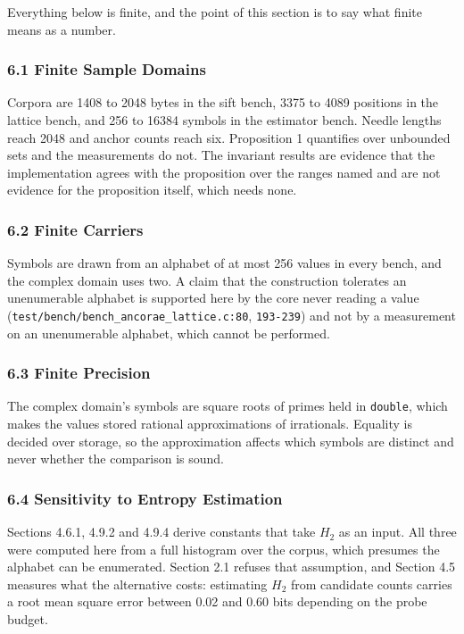 Everything below is finite, and the point of this section is to say what finite means as a number.

\subsubsection{6.1 Finite Sample Domains}

Corpora are 1408 to 2048 bytes in the sift bench, 3375 to 4089 positions in the lattice bench, and 256 to 16384 symbols in the estimator bench. Needle lengths reach 2048 and anchor counts reach six. Proposition 1 quantifies over unbounded sets and the measurements do not. The invariant results are evidence that the implementation agrees with the proposition over the ranges named and are not evidence for the proposition itself, which needs none.

\subsubsection{6.2 Finite Carriers}

Symbols are drawn from an alphabet of at most 256 values in every bench, and the complex domain uses two. A claim that the construction tolerates an unenumerable alphabet is supported here by the core never reading a value (\texttt{test/\allowbreak{}bench/\allowbreak{}bench\_\allowbreak{}ancorae\_\allowbreak{}lattice.\allowbreak{}c:80}, \texttt{193-\allowbreak{}239}) and not by a measurement on an unenumerable alphabet, which cannot be performed.

\subsubsection{6.3 Finite Precision}

The complex domain's symbols are square roots of primes held in \texttt{double}, which makes the values stored rational approximations of irrationals. Equality is decided over storage, so the approximation affects which symbols are distinct and never whether the comparison is sound.

\subsubsection{6.4 Sensitivity to Entropy Estimation}

Sections 4.6.1, 4.9.2 and 4.9.4 derive constants that take \(H_2\) as an input. All three were computed here from a full histogram over the corpus, which presumes the alphabet can be enumerated. Section 2.1 refuses that assumption, and Section 4.5 measures what the alternative costs: estimating \(H_2\) from candidate counts carries a root mean square error between 0.02 and 0.60 bits depending on the probe budget.

